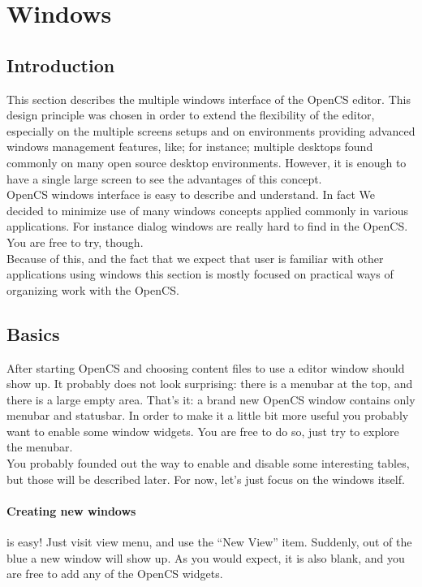 \section{Windows}
\subsection{Introduction}
This section describes the multiple windows interface of the OpenCS editor. This design principle was chosen in order to extend the flexibility of the editor, especially on the multiple screens setups and on environments providing advanced windows management features, like; for instance; multiple desktops found commonly on many open source desktop environments. However, it is enough to have a single large screen to see the advantages of this concept.\\
OpenCS windows interface is easy to describe and understand. In fact We decided to minimize use of many windows concepts applied commonly in various applications. For instance dialog windows are really hard to find in the OpenCS. You are free to try, though.\\
Because of this, and the fact that we expect that user is familiar with other applications using windows this section is mostly focused on practical ways of organizing work with the OpenCS.

\subsection{Basics}
After starting Open{CS} and choosing content files to use a editor window should show up. It probably does not look surprising: there is a menubar at the top, and there is a large empty area. That's it: a brand new Open{CS} window contains only menubar and statusbar. In order to make it a little bit more useful you probably want to enable some window widgets. You are free to do so, just try to explore the menubar. \\
You probably founded out the way to enable and disable some interesting tables, but those will be described later. For now, let's just focus on the windows itself.

\paragraph{Creating new windows}
is easy! Just visit view menu, and use the ``New View'' item. Suddenly, out of the blue a new window will show up. As you would expect, it is also blank, and you are free to add any of the Open{CS} widgets.


